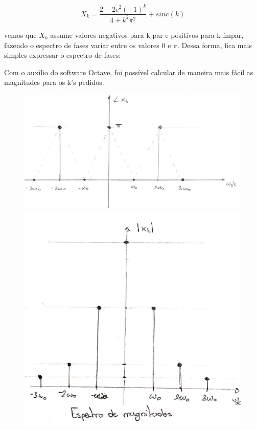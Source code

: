 \documentclass{article}
\begin{document}
\[X_{k} = \frac{2 - 2e^2(-1)^{k}}{4 + k^2\pi^2} + sinc(k)\]

vemos que $X_{k}$ assume valores negativos para k par e positivos para k ímpar, fazendo o espectro de fases variar entre os valores $0$ e $\pi$. Dessa forma, fica mais simples expressar o espectro de fases:

Com o auxílio do software Octave, foi possível calcular de maneira mais fácil as magnitudes para os k's pedidos.

\newpage

\begin{figure}[!ht]
    \includegraphics[scale=0.25]{img3e_fase}
    \includegraphics[scale=0.25]{img3e_mag}
    \centering
\end{figure}
\end{document}
